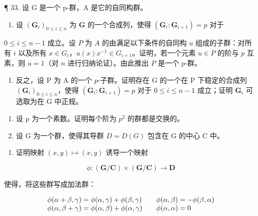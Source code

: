 ¶ 33. 设 G 是一个 p-群，A 是它的自同构群。

\begin{enumerate}
\def\labelenumi{(\alph{enumi})}
\tightlist
\item
  设 \((\mathbf{G}_i)_{0\leqslant i\leqslant n}\) 为 \(\mathbf{G}\) 的一个合成列，使得 \((\mathbf{G}_i:\mathbf{G}_{i + 1}) = p\) 对于
\end{enumerate}

\(0 \leqslant i \leqslant n - 1\) 成立。设 \(P\) 为 \(A\) 的由满足以下条件的自同构 \(u\) 组成的子群：对所有 \(i\) 以及所有 \(x \in G_i\)，\(u(x)x^{-1} \in G_{i+1}\)。证明，若一个元素 \(u \in P\) 的阶与 \(p\) 互素，则 \(u = 1\)（对 \(n\) 进行归纳论证）。由此推出 \(P\) 是一个 \(p\)-群。

\begin{enumerate}
\def\labelenumi{(\alph{enumi})}
\setcounter{enumi}{1}
\tightlist
\item
  反之，设 P 为 A 的一个 \(p\)-子群。证明存在 G 的一个在 P 下稳定的合成列 \((\mathbf{G}_i)_{0 \leqslant i \leqslant n}\)，使得 \((\mathbf{G}_i: \mathbf{G}_{i+1}) = p\) 对于 \(0 \leqslant i \leqslant n-1\) 成立；证明 \(\mathbf{G}_i\) 可选取为在 G 中正规。
\end{enumerate}

\begin{enumerate}
\def\labelenumi{\arabic{enumi}。}
\setcounter{enumi}{33}
\item
  设 p 为一个素数。证明每个阶为 \(p^{2}\) 的群都是交换的。
\item
  设 G 为一个群，使得其导群 \(D = D(G)\) 包含在 G 的中心 C 中。
\end{enumerate}

\begin{enumerate}
\def\labelenumi{(\alph{enumi})}
\tightlist
\item
  证明映射 \((x,y)\mapsto (x,y)\) 诱导一个映射
\end{enumerate}

\[
\phi \colon (\mathbf {G} / \mathbf {C}) \times (\mathbf {G} / \mathbf {C}) \rightarrow \mathbf {D}
\]

使得，将这些群写成加法群：

\[
\begin{array}{l l} \phi (\alpha + \beta , \gamma) = \phi (\alpha , \gamma) + \phi (\beta , \gamma) & \quad \phi (\alpha , \beta) = - \phi (\beta , \alpha) \\ \phi (\alpha , \beta + \gamma) = \phi (\alpha , \beta) + \phi (\alpha , \gamma) & \quad \phi (\alpha , \alpha) = 0 \end{array}
\]

